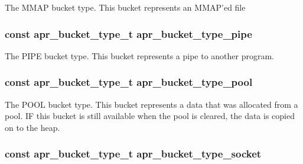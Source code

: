The M\-M\-A\-P bucket type. This bucket represents an M\-M\-A\-P'ed file \hypertarget{group___a_p_r___util___bucket___brigades_ga334a875abb2908364a40abbfa80c401f}{
\subsubsection[{apr\-\_\-bucket\-\_\-type\-\_\-pipe}]{\setlength{\rightskip}{0pt plus 5cm}const {\bf apr\-\_\-bucket\-\_\-type\-\_\-t} apr\-\_\-bucket\-\_\-type\-\_\-pipe}}\label{group___a_p_r___util___bucket___brigades_ga334a875abb2908364a40abbfa80c401f}
The P\-I\-P\-E bucket type. This bucket represents a pipe to another program. \hypertarget{group___a_p_r___util___bucket___brigades_ga87bace819fdbf07c12497a8289b3567b}{
\subsubsection[{apr\-\_\-bucket\-\_\-type\-\_\-pool}]{\setlength{\rightskip}{0pt plus 5cm}const {\bf apr\-\_\-bucket\-\_\-type\-\_\-t} apr\-\_\-bucket\-\_\-type\-\_\-pool}}\label{group___a_p_r___util___bucket___brigades_ga87bace819fdbf07c12497a8289b3567b}
The P\-O\-O\-L bucket type. This bucket represents a data that was allocated from a pool. I\-F this bucket is still available when the pool is cleared, the data is copied on to the heap. \hypertarget{group___a_p_r___util___bucket___brigades_gaa6d9978cc10895bdf0a4686728822a84}{
\subsubsection[{apr\-\_\-bucket\-\_\-type\-\_\-socket}]{\setlength{\rightskip}{0pt plus 5cm}const {\bf apr\-\_\-bucket\-\_\-type\-\_\-t} apr\-\_\-bucket\-\_\-type\-\_\-socket}}\label{group___a_p_r___util___bucket___brigades_gaa6d9978cc10895bdf0a4686728822a84}
